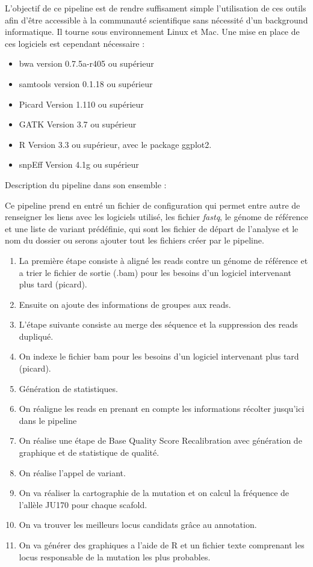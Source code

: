 \documentclass[12pt]{article}
\begin{document}
L'objectif de ce pipeline est de rendre suffisament simple l'utilisation de ces outils afin d'être accessible à la communauté scientifique sans nécessité d'un background informatique. Il tourne sous environnement Linux et Mac.
Une mise en place de ces logiciels est cependant nécessaire :

\begin{itemize}
\item bwa version 0.7.5a-r405 ou supérieur
\item samtools version 0.1.18 ou supérieur
\item Picard Version 1.110 ou supérieur
\item GATK Version 3.7 ou supérieur
\item R Version 3.3 ou supérieur, avec le package ggplot2.
\item snpEff Version 4.1g ou supérieur
\end{itemize}

Description du pipeline dans son ensemble :

Ce pipeline prend en entré un fichier de configuration qui permet entre autre de renseigner les liens avec les logiciels utilisé, les fichier \textit{fastq}, le génome de référence et une liste de variant prédéfinie, qui sont les fichier de départ de l'analyse et le nom du dossier ou serons ajouter tout les fichiers créer par le pipeline. 

\begin{enumerate}
\item La première étape consiste à aligné les reads contre un génome de référence et a trier le fichier de sortie (.bam) pour les besoins d'un logiciel intervenant plus tard (picard). 
\item Ensuite on ajoute des informations de groupes aux reads.
\item L'étape suivante consiste au merge des séquence et la suppression des reads dupliqué. 
\item On indexe le fichier bam pour les besoins d'un logiciel intervenant plus tard (picard). 
\item Génération de statistiques.
\item On réaligne les reads en prenant en compte les informations récolter jusqu'ici dans le pipeline
\item On réalise une étape de Base Quality Score Recalibration avec génération de graphique et de statistique de qualité.
\item On réalise l'appel de variant. 
\item On va réaliser la cartographie de la mutation et on calcul la fréquence de l'allèle JU170 pour chaque scafold. 
\item On va trouver les meilleurs locus candidats grâce au annotation. 
\item On va générer des graphiques a l'aide de R et un fichier texte comprenant les locus responsable de la mutation les plus probables. 
\end{enumerate}
\end{document}
